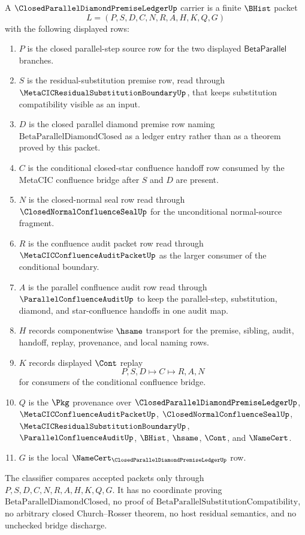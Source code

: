 \begin{definition}
\label{def:closed-parallel-diamond-premise-ledger-carrier}
A $\ClosedParallelDiamondPremiseLedgerUp$ carrier is a finite $\BHist$ packet
$$
L=(P,S,D,C,N,R,A,H,K,Q,G)
$$
with the following displayed rows:
\begin{enumerate}
\item $P$ is the closed parallel-step source row for the two displayed $\mathsf{BetaParallel}$ branches.
\item $S$ is the residual-substitution premise row, read through $\MetaCICResidualSubstitutionBoundaryUp$, that keeps substitution compatibility visible as an input.
\item $D$ is the closed parallel diamond premise row naming $\mathrm{BetaParallelDiamondClosed}$ as a ledger entry rather than as a theorem proved by this packet.
\item $C$ is the conditional closed-star confluence handoff row consumed by the MetaCIC confluence bridge after $S$ and $D$ are present.
\item $N$ is the closed-normal seal row read through $\ClosedNormalConfluenceSealUp$ for the unconditional normal-source fragment.
\item $R$ is the confluence audit packet row read through $\MetaCICConfluenceAuditPacketUp$ as the larger consumer of the conditional boundary.
\item $A$ is the parallel confluence audit row read through $\ParallelConfluenceAuditUp$ to keep the parallel-step, substitution, diamond, and star-confluence handoffs in one audit map.
\item $H$ records componentwise $\hsame$ transport for the premise, sibling, audit, handoff, replay, provenance, and local naming rows.
\item $K$ records displayed $\Cont$ replay
$$
P,S,D \longmapsto C \longmapsto R,A,N
$$
for consumers of the conditional confluence bridge.
\item $Q$ is the $\Pkg$ provenance over $\ClosedParallelDiamondPremiseLedgerUp$, $\MetaCICConfluenceAuditPacketUp$, $\ClosedNormalConfluenceSealUp$, $\MetaCICResidualSubstitutionBoundaryUp$, $\ParallelConfluenceAuditUp$, $\BHist$, $\hsame$, $\Cont$, and $\NameCert$.
\item $G$ is the local $\NameCert_{\ClosedParallelDiamondPremiseLedgerUp}$ row.
\end{enumerate}
The classifier compares accepted packets only through $P,S,D,C,N,R,A,H,K,Q,G$. It has no coordinate proving $\mathrm{BetaParallelDiamondClosed}$, no proof of $\mathrm{BetaParallelSubstitutionCompatibility}$, no arbitrary closed Church--Rosser theorem, no host residual semantics, and no unchecked bridge discharge.
\end{definition}

